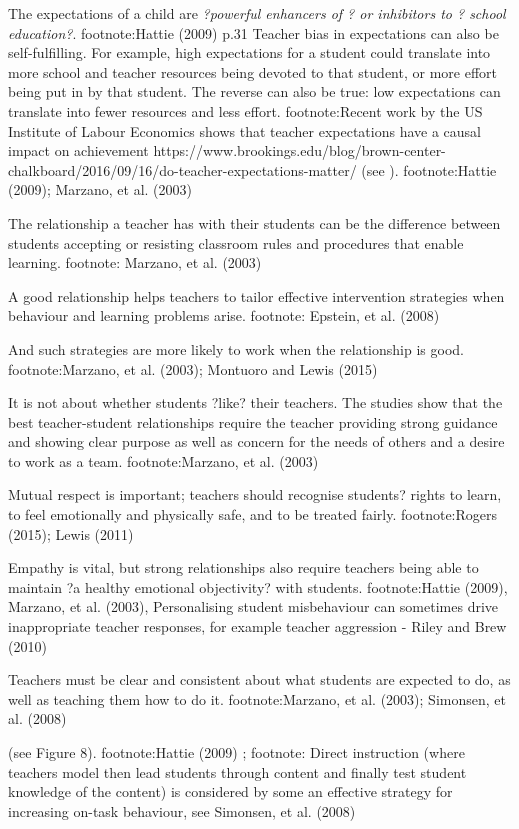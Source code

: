 The expectations of a child are \emph{?powerful enhancers of ? or inhibitors to ? school education?}. footnote:Hattie (2009) p.31  
Teacher bias in expectations can also be self-fulfilling. For example, high expectations for a student could translate into more school and teacher resources being devoted to that student, or more effort being put in by that student. The reverse can also be true: low expectations can translate into fewer resources and less effort. footnote:Recent work by the US Institute of Labour Economics shows that teacher expectations have a causal impact on achievement https://www.brookings.edu/blog/brown-center-chalkboard/2016/09/16/do-teacher-expectations-matter/
(see ). footnote:Hattie (2009); Marzano, et al. (2003) 

The relationship a teacher has with their students can be the difference between students accepting or resisting classroom rules and procedures that enable learning. footnote: Marzano, et al. (2003)

A good relationship helps teachers to tailor effective intervention strategies when behaviour and learning problems arise. footnote: Epstein, et al. (2008)

And such strategies are more likely to work when the relationship is good.  footnote:Marzano, et al. (2003); Montuoro and Lewis (2015)

It is not about whether students ?like? their teachers. The studies show that the best teacher-student relationships require the teacher providing strong guidance and showing clear purpose as well as concern for the needs of others and a desire to work as a team.  footnote:Marzano, et al. (2003)

Mutual respect is important; teachers should recognise students? rights to learn, to feel emotionally and physically safe, and to be treated fairly. footnote:Rogers (2015); Lewis (2011) 

Empathy is vital, but strong relationships also require teachers being able to maintain ?a healthy emotional objectivity? with students. footnote:Hattie (2009), Marzano, et al. (2003), Personalising student misbehaviour can sometimes drive inappropriate teacher responses, for example teacher aggression - Riley and Brew (2010)

Teachers must be clear and consistent about what students are expected to do, as well as teaching them how to do it. footnote:Marzano, et al. (2003); Simonsen, et al. (2008)

(see Figure 8). footnote:Hattie (2009) ; footnote: Direct instruction (where teachers model then lead students through content and finally test student knowledge of the content) is considered by some an effective strategy for increasing on-task behaviour, see Simonsen, et al. (2008)


